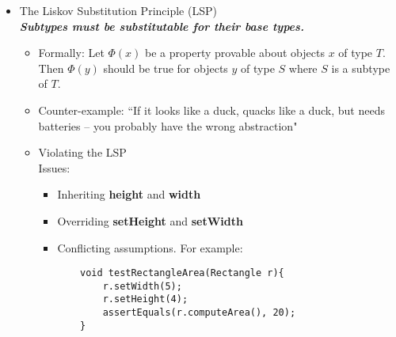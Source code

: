 \begin{itemize}

	\item The Liskov Substitution Principle (LSP)\\
	\textbf{\emph{Subtypes must be substitutable for their base types.}}
	\begin{itemize}
		\item Formally: Let $ \Phi(x) $ be a property provable about objects $ x $ of type $ T $. Then $ \Phi(y) $ should be true for objects $ y $ of type $ S $ where $ S $ is a subtype of $ T $.
		\item Counter-example: ``If it looks like a duck, quacks like a duck, but needs batteries – you probably have the wrong abstraction"
		\item Violating the LSP\\
		Issues:\\
		\begin{minipage}{0.6\textwidth}
			\begin{itemize}
				\item Inheriting \textbf{height} and \textbf{width}
				\item Overriding \textbf{setHeight} and \textbf{setWidth}
				\item Conflicting assumptions. For example:
				\begin{Verbatim}
	void testRectangleArea(Rectangle r){
		r.setWidth(5);
		r.setHeight(4);
		assertEquals(r.computeArea(), 20);
	}
				\end{Verbatim}
			\end{itemize}
		\end{minipage}
		\begin{minipage}{0.3\textwidth}
\end{minipage}
\end{itemize}
\end{itemize}
